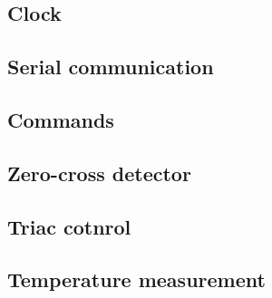 \subsection{Clock}
\subsection{Serial communication}
\subsection{Commands}
\subsection{Zero-cross detector}
\subsection{Triac cotnrol}
\subsection{Temperature measurement}
